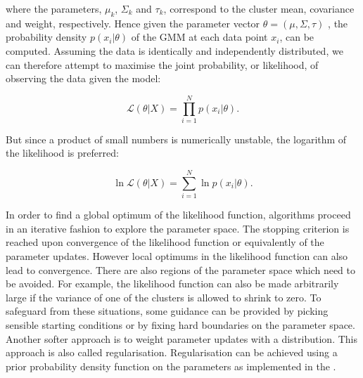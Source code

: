 where the parameters, $\mu_k$, $\Sigma_k$ and $\tau_k$, correspond to the cluster mean, covariance and weight, respectively.
Hence given the parameter vector $\theta = ( \mu, \Sigma, \tau )$ , the probability density $p(x_i|\theta)$ of the \gls{GMM} at each data point $x_i$, can be computed.
Assuming the data is identically and independently distributed, we can therefore attempt to maximise the joint probability, or likelihood,
of observing the data given the model:

\[
\mathcal{L}(\theta |X) = \prod_{i=1}^N p(x_i|\theta).
\]

But since a product of small numbers is numerically unstable, the logarithm of the likelihood is preferred:

\[
\ln \mathcal{L}(\theta |X) = \sum_{i=1}^N \ln p(x_i|\theta).
\]

In order to find a global optimum of the likelihood function, algorithms proceed in an iterative fashion to explore the parameter space.
The stopping criterion is reached upon convergence of the likelihood function or equivalently of the parameter updates.
However local optimums in the likelihood function can also lead to convergence.
There are also regions of the parameter space which need to be avoided.
For example, the likelihood function can also be made arbitrarily large if the variance of one of the clusters is allowed to shrink to zero.
To safeguard from these situations,
some guidance can be provided by picking sensible starting conditions or by fixing hard boundaries on the parameter space.
Another softer approach is to weight parameter updates with a distribution.
This approach is also called regularisation.
Regularisation can be achieved using a prior probability density function on the parameters as implemented in the .


